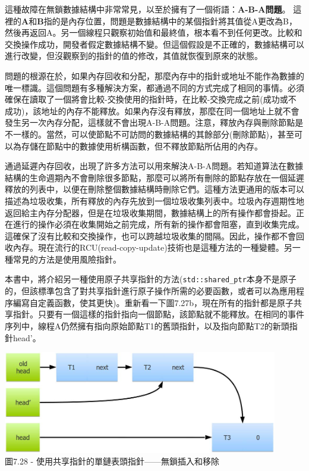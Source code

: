這種故障在無鎖數據結構中非常常見，以至於擁有了一個術語：\textbf{A-B-A問題}。 這裡的\textbf{A}和\textbf{B}指的是內存位置，問題是數據結構中的某個指針將其值從A更改為B，然後再返回A。另一個線程只觀察初始值和最終值，根本看不到任何更改。比較和交換操作成功，開發者假定數據結構不變。但這個假設是不正確的，數據結構可以進行改變，但沒觀察到的指針的值的修改，其值就恢復到原來的狀態。

問題的根源在於，如果內存回收和分配，那麼內存中的指針或地址不能作為數據的唯一標識。這個問題有多種解決方案，都通過不同的方式完成了相同的事情。必須確保在讀取了一個將會比較-交換使用的指針時，在比較-交換完成之前(成功或不成功)，該地址的內存不能釋放。如果內存沒有釋放，那麼在同一個地址上就不會發生另一次內存分配，這樣就不會出現A-B-A問題。注意，釋放內存與刪除節點是不一樣的。當然，可以使節點不可訪問的數據結構的其餘部分(刪除節點)，甚至可以為存儲在節點中的數據使用析構函數，但不釋放節點所佔用的內存。

通過延遲內存回收，出現了許多方法可以用來解決A-B-A問題。若知道算法在數據結構的生命週期內不會刪除很多節點，那麼可以將所有刪除的節點存放在一個延遲釋放的列表中，以便在刪除整個數據結構時刪除它們。這種方法更通用的版本可以描述為垃圾收集，所有釋放的內存先放到一個垃圾收集列表中。垃圾內存週期性地返回給主內存分配器，但是在垃圾收集期間，數據結構上的所有操作都會掛起。正在進行的操作必須在收集開始之前完成，所有新的操作都會阻塞，直到收集完成。這確保了沒有比較和交換操作，也可以跨越垃圾收集的間隔。因此，操作都不會回收內存。現在流行的RCU(read-copy-update)技術也是這種方法的一種變體。另一種常見的方法是使用風險指針。

本書中，將介紹另一種使用原子共享指針的方法(\texttt{std::shared\_ptr}本身不是原子的，但該標準包含了對共享指針進行原子操作所需的必要函數，或者可以為應用程序編寫自定義函數，使其更快)。重新看一下圖7.27b，現在所有的指針都是原子共享指針。只要有一個這樣的指針指向一個節點，該節點就不能釋放。在相同的事件序列中，線程A仍然擁有指向原始節點T1的舊頭指針，以及指向節點T2的新頭指針head'。

\begin{center}
\includegraphics[width=0.9\textwidth]{content/2/chapter7/images/28.jpg}\\
圖7.28 - 使用共享指針的單鏈表頭指針——無鎖插入和移除
\end{center}

